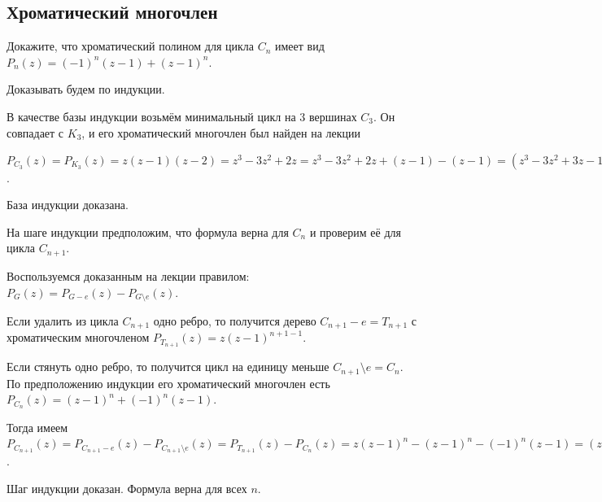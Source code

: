 \documentclass[a4paper,12pt]{article}
\numberwithin{figure}{section}
\begin{document}
\subsection{Хроматический многочлен}

\begin{problem}
	Докажите, что хроматический полином для цикла $C_n$ имеет вид
	$P_n(z) = (-1)^n(z-1)+(z-1)^n$.
\end{problem}
\begin{solution}
	Доказывать будем по индукции.
	
	В качестве базы индукции возьмём минимальный цикл на 3 вершинах $C_3$. Он совпадает с $K_3$, и его хроматический многочлен был найден на лекции
	
	$P_{C_3}(z) = P_{K_3}(z) = z(z-1)(z-2) = z^3-3z^2+2z = z^3-3z^2+2z+(z-1)-(z-1)
	 = (z^3-3z^2+3z-1)+(-1)(z-1) = (z-1)^3+(-1)^3(z-1)$.
	
	База индукции доказана.
	
	На шаге индукции предположим, что формула верна для $C_n$ и проверим её для цикла $C_{n+1}$.
	
	Воспользуемся доказанным на лекции правилом:
	$P_{G}(z) = P_{G-e}(z) - P_{G\setminus e}(z)$.
	
	Если удалить из цикла $C_{n+1}$ одно ребро,
	то получится дерево $C_{n+1}-e=T_{n+1}$ с хроматическим многочленом
	$P_{T_{n+1}}(z)=z(z-1)^{n+1-1}$.
	
	Если стянуть одно ребро, то получится цикл на единицу меньше $C_{n+1}\setminus e=C_n$.
	По предположению индукции его хроматический многочлен есть
	$P_{C_{n}}(z) = (z-1)^n + (-1)^n(z-1)$.
	
	Тогда имеем
	$P_{C_{n+1}}(z) = P_{C_{n+1}-e}(z) - P_{C_{n+1}\setminus e}(z)
	 = P_{T_{n+1}}(z) - P_{C_{n}}(z) = z(z-1)^n - (z-1)^n - (-1)^n(z-1)
	 = (z-1)(z-1)^n + (-1)(-1)^n(z-1) = (z-1)^{n+1} + (-1)^{n+1}(z-1)$.
	
	Шаг индукции доказан. Формула верна для всех $n$.
\end{solution}
\end{document}
